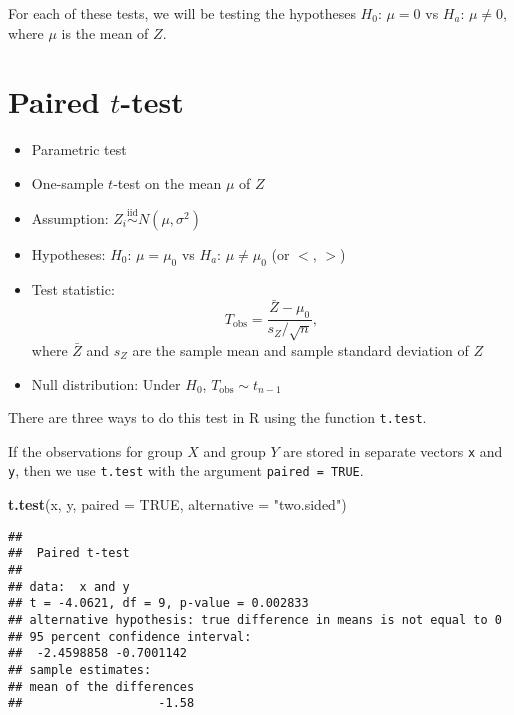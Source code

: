 \documentclass[
]{book}
\newenvironment{Shaded}{\begin{snugshade}}{\end{snugshade}}
\newcommand{\DataTypeTok}[1]{\textcolor[rgb]{0.13,0.29,0.53}{#1}}
\newcommand{\KeywordTok}[1]{\textcolor[rgb]{0.13,0.29,0.53}{\textbf{#1}}}
\newcommand{\NormalTok}[1]{#1}
\newcommand{\OtherTok}[1]{\textcolor[rgb]{0.56,0.35,0.01}{#1}}
\newcommand{\StringTok}[1]{\textcolor[rgb]{0.31,0.60,0.02}{#1}}
\providecommand{\tightlist}{%
  \setlength{\itemsep}{0pt}\setlength{\parskip}{0pt}}
\begin{document}
For each of these tests, we will be testing the hypotheses
\(H_0\): \(\mu = 0\) vs \(H_a\): \(\mu \neq 0\),
where \(\mu\) is the mean of \(Z\).

\hypertarget{paired-t-test}{%
\section{\texorpdfstring{Paired \(t\)-test}{Paired t-test}}\label{paired-t-test}}

\begin{itemize}
\tightlist
\item
  Parametric test
\item
  One-sample \(t\)-test on the mean \(\mu\) of \(Z\)
\item
  Assumption: \(Z_i \overset{\mathrm{iid}} \sim N(\mu, \sigma^2)\)
\item
  Hypotheses: \(H_0\): \(\mu = \mu_0\) vs \(H_a\): \(\mu \neq \mu_0\) (or \(<\), \(>\))
\item
  Test statistic: \[T_{\mathrm{obs}} = \frac{\bar{Z} - \mu_0}{s_Z / \sqrt{n}},\]
  where \(\bar{Z}\) and \(s_Z\) are the sample mean and sample standard deviation
  of \(Z\)
\item
  Null distribution: Under \(H_0\), \(T_{\mathrm{obs}} \sim t_{n-1}\)
\end{itemize}

There are three ways to do this test in R using the function \texttt{t.test}.

If the observations for group \(X\) and group \(Y\) are stored in separate vectors \texttt{x} and \texttt{y},
then we use \texttt{t.test} with the argument \texttt{paired\ =\ TRUE}.

\begin{Shaded}
\begin{Highlighting}[]
\KeywordTok{t.test}\NormalTok{(x, y, }\DataTypeTok{paired =} \OtherTok{TRUE}\NormalTok{, }\DataTypeTok{alternative =} \StringTok{"two.sided"}\NormalTok{)}
\end{Highlighting}
\end{Shaded}

\begin{verbatim}
## 
##  Paired t-test
## 
## data:  x and y
## t = -4.0621, df = 9, p-value = 0.002833
## alternative hypothesis: true difference in means is not equal to 0
## 95 percent confidence interval:
##  -2.4598858 -0.7001142
## sample estimates:
## mean of the differences 
##                   -1.58
\end{verbatim}
\end{document}
